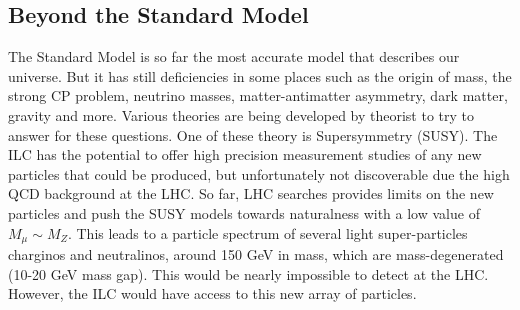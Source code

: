 \subsection{Beyond the Standard Model}

The Standard Model is so far the most accurate model that describes our universe. But it has still deficiencies in some places such as the origin of mass, the strong CP problem, neutrino masses, matter-antimatter asymmetry, dark matter, gravity and more. Various theories are being developed by theorist to try to answer for these questions. One of these theory is Supersymmetry (SUSY). The ILC has the potential to offer high precision measurement studies of any new particles that could be produced, but unfortunately not discoverable due the high QCD background at the LHC. So far, LHC searches provides limits on the new particles and push the SUSY models towards naturalness with a low value of $M_{\mu} \sim M_Z$. This leads to a particle spectrum of several light super-particles charginos and neutralinos, around 150 GeV in mass, which are mass-degenerated (10-20 GeV mass gap). This would be nearly impossible to detect at the LHC. However, the ILC would have access to this new array of particles.
